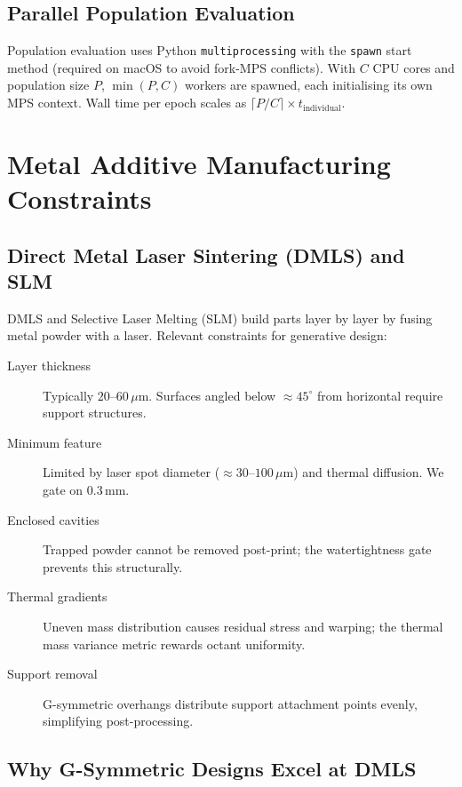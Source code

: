 \documentclass[11pt, a4paper]{article}
\begin{document}
\subsection{Parallel Population Evaluation}

Population evaluation uses Python \texttt{multiprocessing} with the
\texttt{spawn} start method (required on macOS to avoid fork-MPS conflicts).
With $C$ CPU cores and population size $P$, $\min(P, C)$ workers are spawned,
each initialising its own MPS context. Wall time per epoch scales as
$\lceil P / C \rceil \times t_{\mathrm{individual}}$.

\section{Metal Additive Manufacturing Constraints}
\label{sec:print}

\subsection{Direct Metal Laser Sintering (DMLS) and SLM}

DMLS and Selective Laser Melting (SLM) build parts layer by layer by fusing
metal powder with a laser. Relevant constraints for generative design:

\begin{description}
  \item[Layer thickness] Typically $20$--$60\,\mu\mathrm{m}$. Surfaces
    angled below $\approx 45^\circ$ from horizontal require support structures.
  \item[Minimum feature] Limited by laser spot diameter ($\approx 30$--$100\,\mu\mathrm{m}$) and thermal diffusion. We gate on $0.3\,\mathrm{mm}$.
  \item[Enclosed cavities] Trapped powder cannot be removed post-print; the watertightness gate prevents this structurally.
  \item[Thermal gradients] Uneven mass distribution causes residual stress and warping; the thermal mass variance metric rewards octant uniformity.
  \item[Support removal] G-symmetric overhangs distribute support attachment points evenly, simplifying post-processing.
\end{description}

\subsection{Why G-Symmetric Designs Excel at DMLS}
\end{document}
